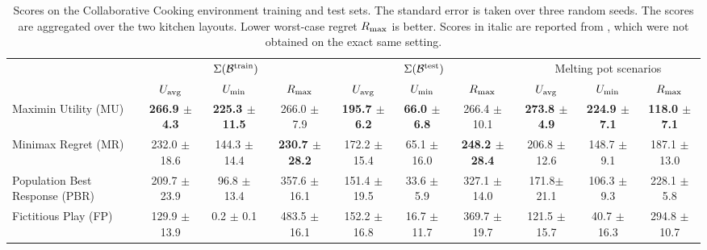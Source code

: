 \begin{table*}[t]
    \small
    \setlength{\tabcolsep}{3pt}
    \centering
    \caption{Scores on the Collaborative Cooking environment training and test sets. The standard error is taken over three random seeds. The scores are aggregated over the two kitchen layouts. Lower worst-case regret $R_\text{max}$ is better. Scores in italic are reported from \citet{agapiou_melting_pot_2_2023}, which were not obtained on the exact same setting.}
    \label{tab:cooking.train}
    \begin{tabular}{l||ccc||ccc||ccc||}%
    & \multicolumn{3}{c||}{$\Sigma(\mathcal{B}^\text{train})$} & \multicolumn{3}{|c||}{$\Sigma(\mathcal{B}^\text{test})$} & \multicolumn{3}{c||}{Melting pot scenarios} \\
    \cmidrule(lr){2-4}\cmidrule(lr){5-7}\cmidrule(lr){8-10}
               & $U_\text{avg}$ & $U_\text{min}$ & $R_\text{max}$ & $U_\text{avg}$ & $U_\text{min}$ & $R_\text{max}$ & $U_\text{avg}$ & $U_\text{min}$ & $R_\text{max}$ \\ \midrule
        Maximin Utility (MU) & \textbf{266.9 {\footnotesize $\pm$ 4.3}} & \textbf{225.3 {\footnotesize$\pm$ 11.5}} & 266.0 {\footnotesize$\pm$ 7.9} & \textbf{195.7 {\footnotesize$\pm$ 6.2}} & \textbf{66.0 {\footnotesize$\pm$ 6.8}} & 266.4 {\footnotesize$\pm$ 10.1} & \textbf{273.8 {\footnotesize$\pm$ 4.9}} & \textbf{224.9 {\footnotesize$\pm$ 7.1}} & \textbf{118.0 {\footnotesize$\pm$ 7.1}} \\
        Minimax Regret (MR) & 232.0 {\footnotesize$\pm$ 18.6} & 144.3 {\footnotesize$\pm$ 14.4} & \textbf{230.7 {\footnotesize$\pm$ 28.2}} & 172.2 {\footnotesize$\pm$ 15.4} & 65.1 {\footnotesize$\pm$ 16.0} & \textbf{248.2 {\footnotesize$\pm$ 28.4}} & 206.8 {\footnotesize$\pm$ 12.6} & 148.7 {\footnotesize$\pm$ 9.1} & 187.1 {\footnotesize$\pm$ 13.0} \\ \hdashline
        Population Best Response (PBR) & 209.7 {\footnotesize$\pm$ 23.9} & 96.8 {\footnotesize$\pm$ 13.4} & 357.6 {\footnotesize$\pm$ 16.1} & 151.4 {\footnotesize$\pm$ 19.5} & 33.6 {\footnotesize$\pm$ 5.9} & 327.1 {\footnotesize$\pm$ 14.0} & 171.8{\footnotesize $\pm$ 21.1} & 106.3 {\footnotesize$\pm$ 9.3} & 228.1 {\footnotesize$\pm$ 5.8} \\
        Fictitious Play (FP) & 129.9 {\footnotesize$\pm$ 13.9} & 0.2 {\footnotesize$\pm$ 0.1} & 483.5 {\footnotesize$\pm$ 16.1} & 152.2 {\footnotesize$\pm$ 16.8} & 16.7 {\footnotesize$\pm$ 11.7} & 369.7 {\footnotesize$\pm$ 19.7} & 121.5 {\footnotesize$\pm$ 15.7} & 40.7 {\footnotesize$\pm$ 16.3} & 294.8 {\footnotesize$\pm$ 10.7} \\

\end{tabular}
\end{table*}
